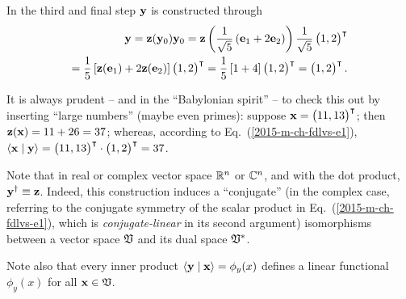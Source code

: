 {In the third and final step ${\bf y}$ is constructed through
\begin{equation}
\begin{split}
{\bf y}
=  {\bf z}  ( {\bf y}_0 ){\bf y}_0
=  {\bf z}  \left( \frac{1}{\sqrt{5}}\left( {\bf e}_1 +2 {\bf e}_2 \right) \right)\frac{1}{\sqrt{5}} \begin{pmatrix} 1,2\end{pmatrix}^\intercal   \\
= \frac{1}{5}  \left[ {\bf z} ( {\bf e}_1) + 2 {\bf z}  ( {\bf e}_2 ) \right] \begin{pmatrix} 1,2\end{pmatrix}^\intercal
= \frac{1}{5}  \left[ 1 + 4 \right] \begin{pmatrix} 1,2\end{pmatrix}^\intercal
=    \begin{pmatrix} 1,2\end{pmatrix}^\intercal
.
\end{split}
\end{equation}

It is always prudent -- and in the ``Babylonian spirit'' -- to check this out by inserting ``large numbers'' (maybe even primes):
suppose ${\bf x} =\begin{pmatrix} 11,13\end{pmatrix}^\intercal $; then
${\bf z}  ( {\bf x} ) = 11 + 26 = 37$; whereas, according to Eq.~(\ref{2015-m-ch-fdlvs-e1}),
$\langle {\bf x}\mid {\bf y}\rangle = \begin{pmatrix} 11,13\end{pmatrix}^\intercal  \cdot    \begin{pmatrix} 1,2\end{pmatrix}^\intercal
= 37$.


\eexample
}

Note that  in  real or complex vector space ${\Bbb R}^n$ or ${\Bbb C}^n$, and with the dot product,  ${\bf y}^\dagger \equiv {\bf z}$.
Indeed, this construction induces a ``conjugate'' (in the complex case, referring to the conjugate symmetry of the scalar product
in Eq.~(\ref{2015-m-ch-fdlvs-e1}),
which is {\em conjugate-linear} in its second argument) isomorphisms between a vector space
${\frak V}$ and its dual space ${\frak V}^\ast$.


Note also that every inner product
$\langle {\bf y}\mid {\bf x} \rangle = \phi_y(x)$ defines a linear
functional $\phi_y(x)$ for all ${\bf x}\in {\frak V}$.




